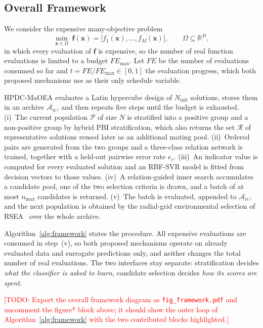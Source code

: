 \documentclass[final,5p,times,twocolumn]{elsarticle}
\newcommand{\vf}{\mathbf{f}}
\newcommand{\vx}{\mathbf{x}}
\newcommand{\TODO}[1]{\textcolor{red}{[TODO: #1]}}
\begin{document}
\subsection{Overall Framework}
\label{sec:method:framework}

We consider the expensive many-objective problem
\begin{equation}
\min_{\vx\in\Omega}\;
\vf(\vx)=\bigl[f_1(\vx),\ldots,f_M(\vx)\bigr],
\qquad
\Omega\subseteq\mathbb{R}^{D},
\label{eq:problem}
\end{equation}
in which every evaluation of $\vf$ is expensive, so the number of real function
evaluations is limited to a budget $FE_{\max}$. Let $FE$ be the number of
evaluations consumed so far and $t=FE/FE_{\max}\in[0,1]$ the evaluation
progress, which both proposed mechanisms use as their only schedule variable.

HPDC-MaOEA evaluates a Latin hypercube design of $N_{\mathrm{init}}$ solutions,
stores them in an archive $\mathcal{A}_{\mathrm{rc}}$, and then repeats five
steps until the budget is exhausted. (i)~The current population $\mathcal{P}$
of size $N$ is stratified into a positive group and a non-positive group by
hybrid PBI stratification, which also returns the set $\mathcal{R}$ of
representative solutions reused later as an additional mating pool.
(ii)~Ordered pairs are generated from the two groups and a three-class relation
network is trained, together with a held-out pairwise error rate $e_r$.
(iii)~An indicator value is computed for every evaluated solution and an
RBF-SVR model is fitted from decision vectors to those values.
(iv)~A relation-guided inner search accumulates a candidate pool, one of the
two selection criteria is drawn, and a batch of at most $n_{\max}$ candidates is
returned. (v)~The batch is evaluated, appended to
$\mathcal{A}_{\mathrm{rc}}$, and the next population is obtained by the
radial-grid environmental selection of RSEA~\cite{ref:rsea} over the whole
archive.

Algorithm~\ref{alg:framework} states the procedure. All expensive evaluations
are consumed in step~(v), so both proposed mechanisms operate on already
evaluated data and surrogate predictions only, and neither changes the total
number of real evaluations. The two interfaces stay separate: stratification
decides \emph{what the classifier is asked to learn}, candidate selection
decides \emph{how its scores are spent}.

\TODO{Export the overall framework diagram as \texttt{fig\_framework.pdf} and
uncomment the figure* block above; it should show the outer loop of
Algorithm~\ref{alg:framework} with the two contributed blocks highlighted.}
\end{document}
